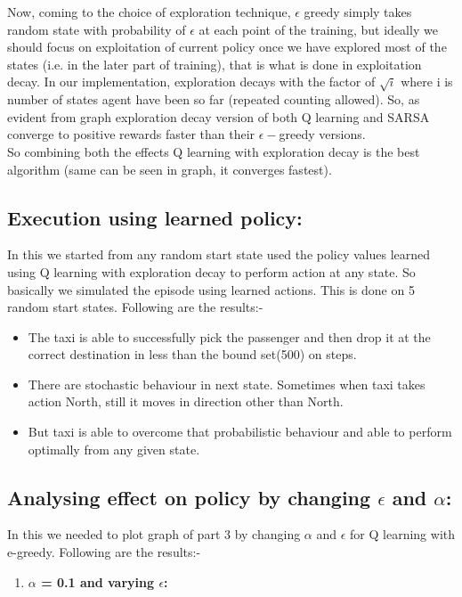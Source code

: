 \documentclass{article}
\begin{document}
\begin{enumerate}[a)]
Now, coming to the choice of exploration technique, $\epsilon$ greedy simply takes random state with probability of $\epsilon$ at each point of the training, but ideally we should focus on exploitation of current policy once we have explored most of the states (i.e. in the later part of training), 
that is what is done in exploitation decay. In our implementation, exploration decays with the factor of $\sqrt{i}$ where i is number of states agent have been so far (repeated counting allowed). So, as evident from graph exploration decay version of both Q learning and SARSA converge to positive rewards faster than 
their $\epsilon-$greedy versions.\\

So combining both the effects Q learning with exploration decay is the best algorithm (same can be seen in graph, it converges fastest).  


\subsection{Execution using learned policy:}
In this we started from any random start state used the policy values learned using Q learning with exploration decay to perform action at any state. So basically 
we simulated the episode using learned actions. This is done on 5 random start states. Following are the results:-

\begin{itemize}
    \item The taxi is able to successfully pick the passenger and then drop it at the correct destination in less than the bound set(500) on steps.
    \item There are stochastic behaviour in next state. Sometimes when taxi takes action North, still it moves in direction other than North.
    \item But taxi is able to overcome that probabilistic behaviour and able to perform optimally from any given state.
\end{itemize}

\subsection{Analysing effect on policy by changing $\epsilon$ and $\alpha$:}
In this we needed to plot graph of part 3 by changing $\alpha$ and $\epsilon$ for Q learning with e-greedy. Following are the results:- 

\begin{enumerate}
    \item \textbf{$\alpha$ = 0.1 and varying $\epsilon$: }
    

\end{enumerate}
\end{enumerate}
\end{document}
